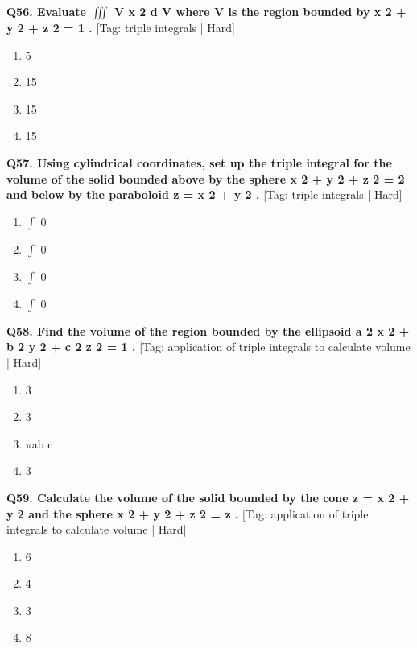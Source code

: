 \noindent\textbf{Q56. Evaluate $\iiint$ V x 2 d V where V is the region bounded by x 2 + y 2 + z 2 = 1 .} \hfill [Tag: triple integrals | Hard]
\begin{enumerate}[label=(\alph*),topsep=2pt,itemsep=1pt,partopsep=0pt,parsep=0pt]
    \item {{5}}
    \item {{15}}
    \item {{15}}
    \item {{15}}
\end{enumerate}
\vspace{2mm}

\noindent\textbf{Q57. Using cylindrical coordinates, set up the triple integral for the volume of the solid bounded above by the sphere x 2 + y 2 + z 2 = 2 and below by the paraboloid z = x 2 + y 2 .} \hfill [Tag: triple integrals | Hard]
\begin{enumerate}[label=(\alph*),topsep=2pt,itemsep=1pt,partopsep=0pt,parsep=0pt]
    \item {{$\int$ 0}}
    \item {{$\int$ 0}}
    \item {{$\int$ 0}}
    \item {{$\int$ 0}}
\end{enumerate}
\vspace{2mm}

\noindent\textbf{Q58. Find the volume of the region bounded by the ellipsoid a 2 x 2 + b 2 y 2 + c 2 z 2 = 1 .} \hfill [Tag: application of triple integrals to calculate volume | Hard]
\begin{enumerate}[label=(\alph*),topsep=2pt,itemsep=1pt,partopsep=0pt,parsep=0pt]
    \item {{3}}
    \item {{3}}
    \item {{$\pi$ab c}}
    \item {{3}}
\end{enumerate}
\vspace{2mm}

\noindent\textbf{Q59. Calculate the volume of the solid bounded by the cone z = x 2 + y 2 and the sphere x 2 + y 2 + z 2 = z .} \hfill [Tag: application of triple integrals to calculate volume | Hard]
\begin{enumerate}[label=(\alph*),topsep=2pt,itemsep=1pt,partopsep=0pt,parsep=0pt]
    \item {{6}}
    \item {{4}}
    \item {{3}}
    \item {{8}}
\end{enumerate}
\vspace{2mm}

